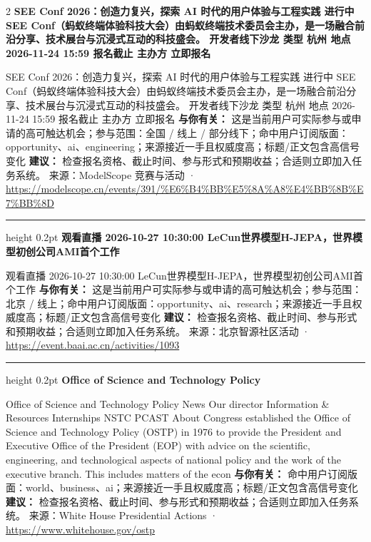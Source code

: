 \documentclass[10.5pt]{ctexart}
\begin{document}
\begin{multicols}{2}
{\large\bfseries SEE Conf 2026：创造力复兴，探索 AI 时代的用户体验与工程实践 进行中 SEE Conf（蚂蚁终端体验科技大会）由蚂蚁终端技术委员会主办，是一场融合前沿分享、技术展台与沉浸式互动的科技盛会。 开发者线下沙龙 类型 杭州 地点 2026-11-24 15:59 报名截止 主办方 立即报名}\par
SEE Conf 2026：创造力复兴，探索 AI 时代的用户体验与工程实践 进行中 SEE Conf（蚂蚁终端体验科技大会）由蚂蚁终端技术委员会主办，是一场融合前沿分享、技术展台与沉浸式互动的科技盛会。 开发者线下沙龙 类型 杭州 地点 2026-11-24 15:59 报名截止 主办方 立即报名
\textbf{与你有关：} 这是当前用户可实际参与或申请的高可触达机会；参与范围：全国 / 线上 / 部分线下；命中用户订阅版面：opportunity、ai、engineering；来源接近一手且权威度高；标题/正文包含高信号变化
\textbf{建议：} 检查报名资格、截止时间、参与形式和预期收益；合适则立即加入任务系统。
{\footnotesize\color{ormuted} 来源：ModelScope 竞赛与活动 · \url{https://modelscope.cn/events/391/%E6%B4%BB%E5%8A%A8%E4%BB%8B%E7%BB%8D}}
\vspace{2mm}
\hrule height 0.2pt
\vspace{2mm}
{\large\bfseries 观看直播 2026-10-27 10:30:00 LeCun世界模型H-JEPA，世界模型初创公司AMI首个工作}\par
观看直播 2026-10-27 10:30:00 LeCun世界模型H-JEPA，世界模型初创公司AMI首个工作
\textbf{与你有关：} 这是当前用户可实际参与或申请的高可触达机会；参与范围：北京 / 线上；命中用户订阅版面：opportunity、ai、research；来源接近一手且权威度高；标题/正文包含高信号变化
\textbf{建议：} 检查报名资格、截止时间、参与形式和预期收益；合适则立即加入任务系统。
{\footnotesize\color{ormuted} 来源：北京智源社区活动 · \url{https://event.baai.ac.cn/activities/1093}}
\vspace{2mm}
\hrule height 0.2pt
\vspace{2mm}
{\large\bfseries Office of Science and Technology Policy}\par
Office of Science and Technology Policy News Our director Information \& Resources Internships NSTC PCAST About Congress established the Office of Science and Technology Policy (OSTP) in 1976 to provide the President and Executive Office of the President (EOP) with advice on the scientific, engineering, and technological aspects of national policy and the work of the executive branch. This includes matters of the econ
\textbf{与你有关：} 命中用户订阅版面：world、business、ai；来源接近一手且权威度高；标题/正文包含高信号变化
\textbf{建议：} 检查报名资格、截止时间、参与形式和预期收益；合适则立即加入任务系统。
{\footnotesize\color{ormuted} 来源：White House Presidential Actions · \url{https://www.whitehouse.gov/ostp}}

\end{multicols}
\end{document}
